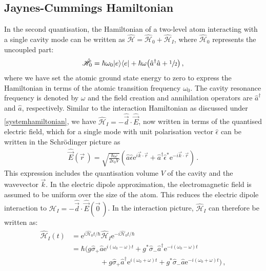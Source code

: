 \documentclass[../Thesis-IJspeert.tex]{subfiles}
\begin{document}
\subsection{Jaynes-Cummings Hamiltonian}
In the second quantisation, the Hamiltonian of a two-level atom interacting with a single cavity mode can be written as $\hat{\mathcal{H}}=\hat{\mathcal{H}}_0+\hat{\mathcal{H}}_I$, where $\hat{\mathcal{H}}_0$ represents the uncoupled part:
\begin{align}
\label{uncoupledham}
\hat{\mathcal{H}}_0=\hbar \omega_0 \vert e \rangle \langle e \vert + \hbar \omega \left( \hat{a}^\dagger \hat{a} + \sfrac{1}{2} \right)\,,
\end{align}
where we have set the atomic ground state energy to zero to express the Hamiltonian in terms of the atomic transition frequency $\omega_0$. The cavity resonance frequency is denoted by $\omega$ and the field creation and annihilation operators are $\hat{a}^\dagger$ and $\hat{a}$, respectively. Similar to the interaction Hamiltonian as discussed under \autoref{systemhamiltonian}, we have $\hat{\mathcal{H}}_I=-\hat{\vec{d}}\cdot \hat{\vec{E}}$, now written in terms of the quantised electric field, which for a single mode with unit polarisation vector $\hat{\epsilon}$ can be written in the Schr\"{o}dinger picture as
\begin{align}
\hat{\vec{E}}(\vec{r}\,) = \sqrt{\frac{\hbar \omega}{2 \epsilon_0 V}} \left( \hat{a} \hat{\epsilon} \mathrm{e}^{i\vec{k}\cdot\vec{r}} + \hat{a}^\dagger \hat{\epsilon}^* \mathrm{e}^{-i\vec{k}\cdot \vec{r}} \right)\,.
\end{align}
This expression includes the quantisation volume $V$ of the cavity and the wavevector $\vec{k}$. In the electric dipole approximation, the electromagnetic field is assumed to be uniform over the size of the atom. This reduces the electric dipole interaction to $\hat{\mathcal{H}}_I=-\hat{\vec{d}}\cdot \hat{\vec{E}}(\vec{0}\,)$. In the interaction picture, $\hat{\mathcal{H}}_I$ can therefore be written as:
\begin{align}
\label{interactionhamiltonianallterms}
\begin{split}
\hat{\mathcal{H}}_I(t) &= \mathrm{e}^{i\hat{\mathcal{H}}_0 t/\hbar}\hat{\mathcal{H}}_I \mathrm{e}^{-i \hat{\mathcal{H}}_0 t/\hbar} \\&= \hbar \Big( g \hat{\sigma}_+ \hat{a} \mathrm{e}^{i(\omega_0-\omega)t} + g^* \hat{\sigma}_- \hat{a}^\dagger \mathrm{e}^{-i(\omega_0-\omega)t} \\ &\hspace{4em}+ g \hat{\sigma}_+ \hat{a}^\dagger \mathrm{e}^{i(\omega_0+\omega)t} + g^* \hat{\sigma}_- \hat{a} \mathrm{e}^{-i(\omega_0+\omega)t}     \Big)\,,
\end{split}
\end{align}
\end{document}
